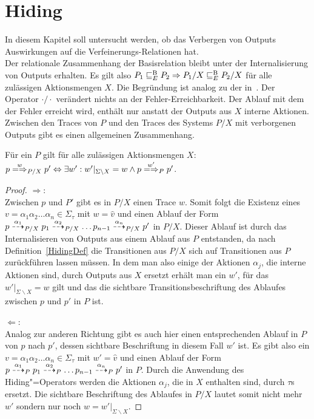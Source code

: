 \section{Hiding}

In diesem Kapitel soll untersucht werden, ob das Verbergen von Outputs
Auswirkungen auf die Verfeinerungs-Relationen \ERel{} hat.\\
Der relationale Zusammenhang der Basisrelation \EBRel{} bleibt unter der
Internalisierung von Outputs erhalten. Es gilt also $P_1 \sqsubseteq  _E^\mathrm{B} P_2 \Rightarrow
P_1/X \sqsubseteq  _E^\mathrm{B} P_2/X$ für alle zulässigen Aktionsmengen $X$. Die Begründung ist
analog zu der in~\cite{Schinko2016BA}. Der Operator $\cdot /\cdot$ verändert
nichts an der Fehler-Erreichbarkeit. Der Ablauf mit dem der Fehler erreicht
wird, enthält nur anstatt der Outputs aus $X$ interne Aktionen.\\
Zwischen den Traces von $P$ und den Traces des Systems $P/X$ mit verborgenen
Outputs gibt es einen allgemeinen Zusammenhang.

\begin{Lem}
  \label{TraceHidingLem}
  Für ein \MEIO{} $P$ gilt für alle zulässigen Aktionsmengen $X$: $p
  \weakmay[w]_{P/X} p' \Leftrightarrow \exists w': w'|_{\Sigma\backslash X} = w
  \land p \weakmay[w']_P p'$.
\end{Lem}
\begin{proof}
  \glqq $\Rightarrow$\grqq{}:\\
  Zwischen $p$ und $P'$ gibt es in $P/X$ einen Trace $w$. Somit folgt die
  Existenz eines $v=\alpha _1\alpha_2\dots\alpha _n\in\Sigma _{\tau}$ mit $w =
  \hat{v}$ und einen Ablauf der Form $p \may[\alpha _1]_{P/X} p_1 \may[\alpha
  _2]_{P/X} \dots p_{n-1} \may[\alpha _n]_{P/X} p'$ in $P/X$. Dieser Ablauf ist
  durch das Internalisieren von Outputs aus einem Ablauf aus $P$ entstanden, da
  nach Definition~\ref{HidingDef} die Transitionen aus $P/X$ sich auf
  Transitionen aus $P$ zurückführen lassen müssen. In dem man also einige der
  Aktionen $\alpha_j$, die interne Aktionen sind, durch Outputs aus $X$ ersetzt
  erhält man ein $w'$, für das $w'|_{\Sigma\backslash X}=w$ gilt und das die
  sichtbare Transitionsbeschriftung des Ablaufes zwischen $p$ und $p'$ in $P$
  ist.

  \glqq $\Leftarrow$\grqq{}:\\
  Analog zur anderen Richtung gibt es auch hier einen entsprechenden Ablauf in
  $P$ von $p$ nach $p'$, dessen sichtbare Beschriftung in diesem Fall $w'$ ist.
  Es gibt also ein $v=\alpha _1\alpha_2\dots\alpha _n\in\Sigma _{\tau}$ mit $w'
  = \hat{v}$ und einen Ablauf der Form $p \may[\alpha _1]_P p_1 \may[\alpha
  _2]_P \dots p_{n-1} \may[\alpha _n]_P p'$ in $P$. Durch die Anwendung des
  Hiding"=Operators werden die Aktionen $\alpha _j$, die in $X$ enthalten sind,
  durch $\tau$s ersetzt. Die sichtbare Beschriftung des Ablaufes in $P/X$
  lautet somit nicht mehr $w'$ sondern nur noch $w = w'|_{\Sigma\backslash X}$.
\end{proof}

